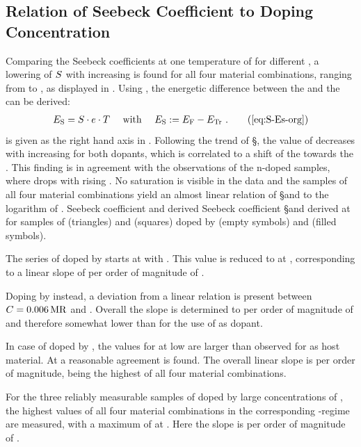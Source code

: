 \subsection{Relation of Seebeck Coefficient to Doping Concentration}%
\label{sec:ResP-S-MR}
%
Comparing the Seebeck coefficients at one temperature of \Tm[40] for different \CLongs, a lowering of $\S$ with increasing \C is found for all four material combinations, ranging from  to , as displayed in .
Using , the energetic difference \Es between the \EfLongL and the \EtLongL can be derived:
\begin{align}
 \Es =\S \cdot e \cdot \T \quad \text{ with } \quad\Es := \Ef - \Et
\PUNKT
\tag{\ref{eq:S-Es-org}}
\end{align}
\Es is given as the right hand axis in .
Following the trend of \S, the value of \Es decreases with increasing \C for both dopants, which is correlated to a shift of the \EfLong \Ef towards the \EtLong \Et. This finding is in agreement with the observations of the n-doped samples, where \Es drops with rising \CLong. No saturation is visible in the data and the samples of all four material combinations yield an almost linear relation of \S and \Es to the logarithm of \C.
%
%
{Seebeck coefficient and derived \EsLong}
{Seebeck coefficient \S and derived \EsLongL at \Tm[40] for samples of \meo (triangles) and \lili (squares) doped by \FS (empty symbols) and \CSF (filled symbols).
}
%

The series of \meo doped by \FS starts at \C[0.004] with \Es[203]. This value is reduced to \Es[45] at \C[0.290], corresponding to a linear slope of  per order of magnitude of \C.

Doping \meo by \CSF instead, a deviation from a linear relation is present between $\C[0.006]$ and . Overall the slope is determined to \Es[67] per order of magnitude of \C and therefore somewhat lower than for the use of \FS as dopant.

In case of \lili doped by \FS, the values for \Es at low \C are larger than observed for \meo as host material. At  a reasonable agreement is found. The overall linear slope is  per order of magnitude, being the highest of all four material combinations.

For the three reliably measurable samples of \lili doped by large concentrations of \CSF, the highest values of all four material combinations in the corresponding \C-regime are measured, with a maximum of \Es[241] at \C[0.056]. Here the slope is  per order of magnitude of \C.

